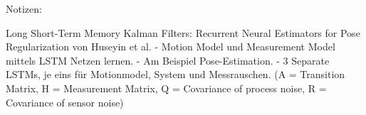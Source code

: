 

Notizen:

Long Short-Term Memory Kalman Filters: Recurrent Neural Estimators for Pose Regularization von Huseyin et al.
- Motion Model und Measurement Model mittels LSTM Netzen lernen. 
- Am Beispiel Pose-Estimation.
- 3 Separate LSTMs, je eins für Motionmodel, System und Messrauschen.
	(A = Transition Matrix, H = Measurement Matrix, Q = Covariance of process noise, R = Covariance of sensor noise)

